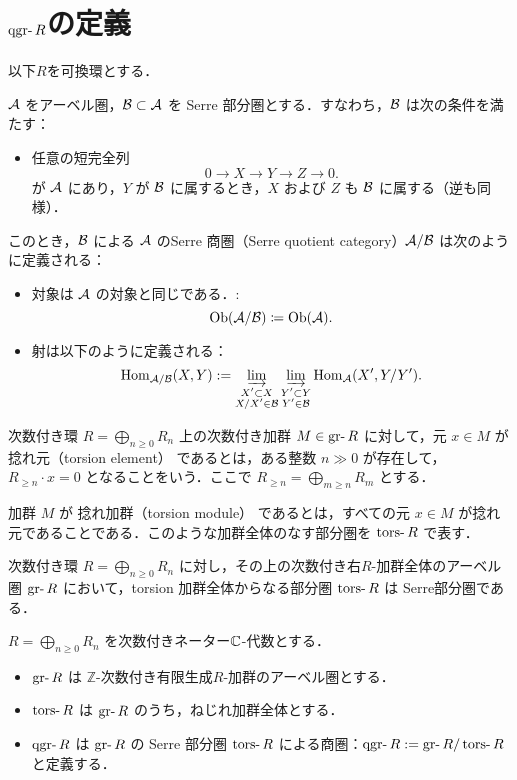 \section{$\qgr R$の定義}

以下$R$を可換環とする．
\begin{defn}
${\mathcal A}$ をアーベル圏，${\mathcal B} \subset {\mathcal A}$ を Serre 部分圏とする．すなわち，${\mathcal B}$ は次の条件を満たす：
\begin{itemize}
  \item 任意の短完全列
  \[
  0 \to X \to Y \to Z \to 0.
  \]
  が ${\mathcal A}$ にあり，$Y$ が ${\mathcal B}$ に属するとき，$X$ および $Z$ も ${\mathcal B}$ に属する（逆も同様）．
\end{itemize}
このとき，${\mathcal B}$ による ${\mathcal A}$ のSerre 商圏（Serre quotient category）${\mathcal A}/{\mathcal B}$ は次のように定義される：
\begin{itemize}
  \item 対象は ${\mathcal A}$ の対象と同じである．:
		\[\mathrm{Ob}({\mathcal A}/{\mathcal B})\coloneq \mathrm{Ob}({\mathcal A}).\]
  \item 射は以下のように定義される：
  \[
  \operatorname{\mathrm{Hom}}_{{\mathcal A}/{\mathcal B}}(X, Y) := \varinjlim_{\substack{X' \subset X\\ X/X' \in {\mathcal B}}} \varinjlim_{\substack{Y' \subset Y\\ Y' \in {\mathcal B}}} \operatorname{\mathrm{Hom}}_{{\mathcal A}}(X', Y/Y').
  \]
\end{itemize}
\end{defn}
	
\begin{defn}
次数付き環 \( R = \bigoplus_{n \ge 0} R_n \) 上の次数付き加群 \( M \in \gr R \) に対して，元 \( x \in M \) が 捻れ元（torsion element） であるとは，ある整数 \( n \gg 0 \) が存在して，\( R_{\ge n} \cdot x = 0 \) となることをいう．ここで \( R_{\ge n} = \bigoplus_{m \ge n} R_m \) とする．

加群 \( M \) が 捻れ加群（torsion module） であるとは，すべての元 \( x \in M \) が捻れ元であることである．このような加群全体のなす部分圏を \(\tors R\) で表す．
\end{defn}

\begin{prop}
次数付き環 \( R = \bigoplus_{n \ge 0} R_n \) に対し，その上の次数付き右$R$-加群全体のアーベル圏 \(\gr R\) において，torsion 加群全体からなる部分圏 \(\tors R\) は Serre部分圏である．
\end{prop}

\begin{defn}\cite{AZ94}
\(
R = \bigoplus_{n \ge 0} R_n
\) を次数付きネーター${\mathbb C}$-代数とする．\vspace{-3mm}
\begin{itemize}
  \item $\gr R$ は $\mathbb{Z}$-次数付き有限生成$R$-加群のアーベル圏とする．
  \item $\tors R$ は $\gr R$ のうち，ねじれ加群全体とする．
  \item $\qgr R$ は $\gr R$ の Serre 部分圏 $\tors R$ による商圏：$\qgr R := \gr R / \tors R$ と定義する．
\end{itemize}
\end{defn}

